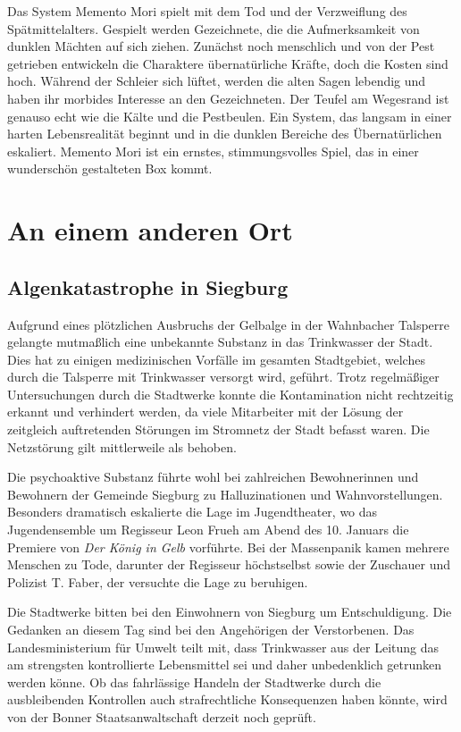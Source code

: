 \documentclass[final]{multiversum}
\begin{document}
Das System Memento Mori spielt mit dem Tod und der Verzweiflung des Spätmittelalters.
Gespielt werden Gezeichnete, die die Aufmerksamkeit von dunklen Mächten auf sich ziehen.
Zunächst noch menschlich und von der Pest getrieben entwickeln die Charaktere übernatürliche Kräfte, doch die Kosten sind hoch.
Während der Schleier sich lüftet, werden die alten Sagen lebendig und haben ihr morbides Interesse an den Gezeichneten.
Der Teufel am Wegesrand ist genauso echt wie die Kälte und die Pestbeulen.
Ein System, das langsam in einer harten Lebensrealität beginnt und in die dunklen Bereiche des Übernatürlichen eskaliert.
Memento Mori ist ein ernstes, stimmungsvolles Spiel, das in einer wunderschön gestalteten Box kommt.

\section{An einem anderen Ort}

\subsection{Algenkatastrophe in Siegburg}

Aufgrund eines plötzlichen Ausbruchs der Gelbalge in der Wahnbacher Talsperre gelangte mutmaßlich eine unbekannte Substanz in das Trinkwasser der Stadt. Dies hat zu einigen medizinischen Vorfälle im gesamten Stadtgebiet, welches durch die Talsperre mit Trinkwasser versorgt wird, geführt. Trotz regelmäßiger Untersuchungen durch die Stadtwerke konnte die Kontamination nicht rechtzeitig erkannt und verhindert werden, da viele Mitarbeiter mit der Lösung der zeitgleich auftretenden Störungen im Stromnetz der Stadt befasst waren. Die Netzstörung gilt mittlerweile als behoben. 

Die psychoaktive Substanz führte wohl bei zahlreichen Bewohnerinnen und Bewohnern der Gemeinde Siegburg zu Halluzinationen und Wahnvorstellungen. Besonders dramatisch eskalierte die Lage im Jugendtheater, wo das Jugendensemble um Regisseur Leon Frueh am Abend des 10. Januars die Premiere von \textit{Der König in Gelb} vorführte. Bei der Massenpanik kamen mehrere Menschen zu Tode, darunter der Regisseur höchstselbst sowie der Zuschauer und Polizist T. Faber, der versuchte die Lage zu beruhigen.

Die Stadtwerke bitten bei den Einwohnern von Siegburg um Entschuldigung. Die Gedanken an diesem Tag sind bei den Angehörigen der Verstorbenen. Das Landesministerium für Umwelt teilt mit, dass Trinkwasser aus der Leitung das am strengsten kontrollierte Lebensmittel sei und daher unbedenklich getrunken werden könne. Ob das fahrlässige Handeln der Stadtwerke durch die ausbleibenden Kontrollen auch strafrechtliche Konsequenzen haben könnte, wird von der Bonner Staatsanwaltschaft derzeit noch geprüft. 
\end{document}
